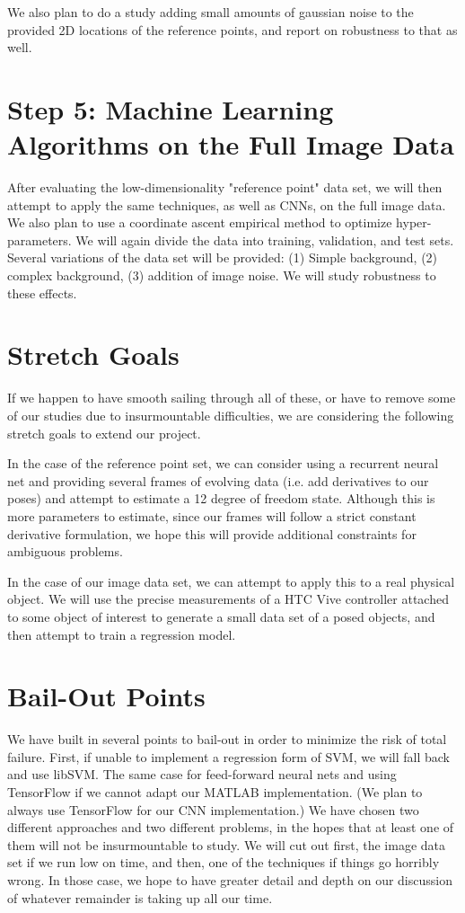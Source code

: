 \documentclass[journal]{IEEEtran}
\begin{document}
We also plan to do a study adding small amounts of gaussian noise to the provided 2D locations of the reference points, and report on robustness to that as well.

\section{Step 5: Machine Learning Algorithms on the Full Image Data}

After evaluating the low-dimensionality "reference point" data set, we will then attempt to apply the same techniques, as well as CNNs, on the full image data.
We also plan to use a coordinate ascent empirical method to optimize hyper-parameters. We will again divide the data into training, validation, and test sets.
Several variations of the data set will be provided: (1) Simple background, (2) complex background, (3) addition of image noise. We will study robustness to these 
effects.

\section{Stretch Goals}
If we happen to have smooth sailing through all of these, or have to remove some of our studies due to insurmountable difficulties, we are considering the following
stretch goals to extend our project.

In the case of the reference point set, we can consider using a recurrent neural net and providing several frames of evolving data (i.e. add derivatives to our poses) and
attempt to estimate a 12 degree of freedom state. Although this is more parameters to estimate, since our frames will follow a strict constant derivative formulation, we hope
this will provide additional constraints for ambiguous problems.

In the case of our image data set, we can attempt to apply this to a real physical object. We will use the precise measurements of a HTC Vive controller attached to some object
of interest to generate a small data set of a posed objects, and then attempt to train a regression model.

\section{Bail-Out Points}
We have built in several points to bail-out in order to minimize the risk of total failure. First, if unable to implement a regression form of SVM, we will fall back and use libSVM. The same case for
feed-forward neural nets and using TensorFlow if we cannot adapt our MATLAB implementation. (We plan to always use TensorFlow for our CNN implementation.) We have chosen two different
approaches and two different problems, in the hopes that at least one of them will not be insurmountable to study. We will cut out first, the image data set if we run low on time, and then, one of
the techniques if things go horribly wrong. In those case, we hope to have greater detail and depth on our discussion of whatever remainder is taking up all our time.
\end{document}
